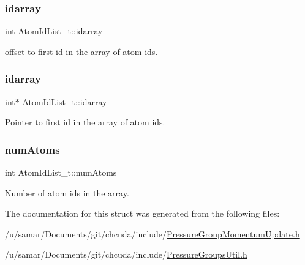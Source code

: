 \subsubsection{\texorpdfstring{idarray}{idarray}\hspace{0.1cm}{\footnotesize\ttfamily [1/2]}}
{\footnotesize\ttfamily int Atom\+Id\+List\+\_\+t\+::idarray}



offset to first id in the array of atom ids. 

\hypertarget{structAtomIdList__t_aed052d4a7583c91ab69a6c72876f2ca0}{}\label{structAtomIdList__t_aed052d4a7583c91ab69a6c72876f2ca0} 
\subsubsection{\texorpdfstring{idarray}{idarray}\hspace{0.1cm}{\footnotesize\ttfamily [2/2]}}
{\footnotesize\ttfamily int$\ast$ Atom\+Id\+List\+\_\+t\+::idarray}



Pointer to first id in the array of atom ids. 

\hypertarget{structAtomIdList__t_a0ce8ab02ed9ac3ba0cd301296b7fe437}{}\label{structAtomIdList__t_a0ce8ab02ed9ac3ba0cd301296b7fe437} 
\subsubsection{\texorpdfstring{num\+Atoms}{numAtoms}}
{\footnotesize\ttfamily int Atom\+Id\+List\+\_\+t\+::num\+Atoms}



Number of atom ids in the array. 



The documentation for this struct was generated from the following files\+:\begin{DoxyCompactItemize}
\item 
/u/samar/\+Documents/git/chcuda/include/\hyperlink{PressureGroupMomentumUpdate_8h}{Pressure\+Group\+Momentum\+Update.\+h}\item 
/u/samar/\+Documents/git/chcuda/include/\hyperlink{PressureGroupsUtil_8h}{Pressure\+Groups\+Util.\+h}\end{DoxyCompactItemize}
